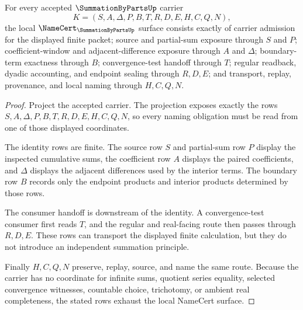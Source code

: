 \begin{theorem}
\label{thm:summation-by-parts-namecert-obligations}
For every accepted $\SummationByPartsUp$ carrier
$$
K=(S,A,\Delta,P,B,T,R,D,E,H,C,Q,N),
$$
the local $\NameCert_{\SummationByPartsUp}$ surface consists exactly of carrier admission for the displayed finite packet; source and partial-sum exposure through $S$ and $P$; coefficient-window and adjacent-difference exposure through $A$ and $\Delta$; boundary-term exactness through $B$; convergence-test handoff through $T$; regular readback, dyadic accounting, and endpoint sealing through $R,D,E$; and transport, replay, provenance, and local naming through $H,C,Q,N$.
\end{theorem}
\begin{proof}
Project the accepted carrier. The projection exposes exactly the rows $S,A,\Delta,P,B,T,R,D,E,H,C,Q,N$, so every naming obligation must be read from one of those displayed coordinates.

The identity rows are finite. The source row $S$ and partial-sum row $P$ display the inspected cumulative sums, the coefficient row $A$ displays the paired coefficients, and $\Delta$ displays the adjacent differences used by the interior terms. The boundary row $B$ records only the endpoint products and interior products determined by those rows.

The consumer handoff is downstream of the identity. A convergence-test consumer first reads $T$, and the regular and real-facing route then passes through $R,D,E$. These rows can transport the displayed finite calculation, but they do not introduce an independent summation principle.

Finally $H,C,Q,N$ preserve, replay, source, and name the same route. Because the carrier has no coordinate for infinite sums, quotient series equality, selected convergence witnesses, countable choice, trichotomy, or ambient real completeness, the stated rows exhaust the local NameCert surface.
\end{proof}

